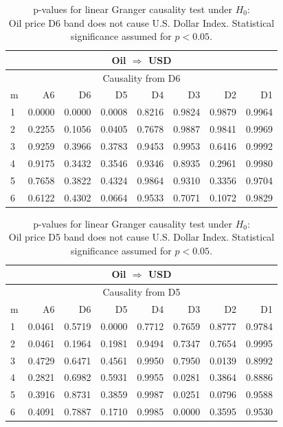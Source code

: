 %
%
\begin{table}[H]
\begin{center}
\begin{tabular}{l|r r r r r r r}
\hline\hline
\multicolumn{8}{c}{Oil $\Rightarrow$ USD}\\
\hline
\multicolumn{8}{c}{Causality from D6}\\
\hline\hline
m & A6 & D6 & D5 & D4 & D3 & D2 & D1 \\
\hline
1 & \cellcolor{mygreen}0.0000 & \cellcolor{mygreen}0.0000 & \cellcolor{mygreen}0.0008 & 0.8216 & 0.9824 & 0.9879 & 0.9964 \\
2 & 0.2255 & 0.1056 & \cellcolor{mygreen}0.0405 & 0.7678 & 0.9887 & 0.9841 & 0.9969 \\
3 & 0.9259 & 0.3966 & 0.3783 & 0.9453 & 0.9953 & 0.6416 & 0.9992 \\
4 & 0.9175 & 0.3432 & 0.3546 & 0.9346 & 0.8935 & 0.2961 & 0.9980 \\
5 & 0.7658 & 0.3822 & 0.4324 & 0.9864 & 0.9310 & 0.3356 & 0.9704 \\
6 & 0.6122 & 0.4302 & 0.0664 & 0.9533 & 0.7071 & 0.1072 & 0.9829 \\
\hline\hline
\end{tabular}
\caption{p-values for linear Granger causality test under $H_0$:\\
Oil price D6 band does not cause U.S. Dollar Index. Statistical significance assumed for $p<0.05$.}
\end{center}
\end{table}

%
%
\begin{table}[H]
\begin{center}
\begin{tabular}{l|r r r r r r r}
\hline\hline
\multicolumn{8}{c}{Oil $\Rightarrow$ USD}\\
\hline
\multicolumn{8}{c}{Causality from D5}\\
\hline\hline
m & A6 & D6 & D5 & D4 & D3 & D2 & D1 \\
\hline
1 & \cellcolor{mygreen}0.0461 & 0.5719 & \cellcolor{mygreen}0.0000 & 0.7712 & 0.7659 & 0.8777 & 0.9784 \\
2 & \cellcolor{mygreen}0.0461 & 0.1964 & 0.1981 & 0.9494 & 0.7347 & 0.7654 & 0.9995 \\
3 & 0.4729 & 0.6471 & 0.4561 & 0.9950 & 0.7950 & \cellcolor{mygreen}0.0139 & 0.8992 \\
4 & 0.2821 & 0.6982 & 0.5931 & 0.9955 & \cellcolor{mygreen}0.0281 & 0.3864 & 0.8886 \\
5 & 0.3916 & 0.8731 & 0.3859 & 0.9987 & \cellcolor{mygreen}0.0251 & 0.0796 & 0.9588 \\
6 & 0.4091 & 0.7887 & 0.1710 & 0.9985 & \cellcolor{mygreen}0.0000 & 0.3595 & 0.9530 \\
\hline\hline
\end{tabular}
\caption{p-values for linear Granger causality test under $H_0$:\\
Oil price D5 band does not cause U.S. Dollar Index. Statistical significance assumed for $p<0.05$.}
\end{center}
\end{table}


